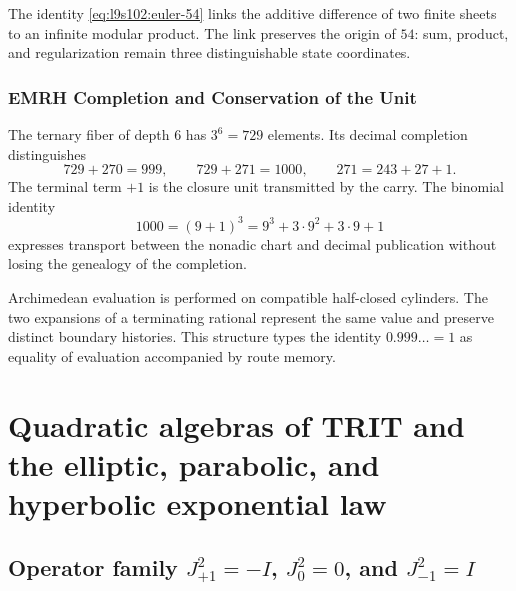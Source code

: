 The identity \cref{eq:l9s102:euler-54} links the additive difference of two finite sheets
to an infinite modular product. The link preserves the origin of
\(54\): sum, product, and regularization remain three distinguishable
state coordinates.

\subsubsection{EMRH Completion and Conservation of the Unit}
\label{sec:l9s102:euler-emrh}

The ternary fiber of depth \(6\) has \(3^6=729\) elements. Its
decimal completion distinguishes
\begin{equation}
 729+270=999,
 \qquad
 729+271=1000,
 \qquad
 271=243+27+1.
 \label{eq:l9s102:euler-729-1000}
\end{equation}
The terminal term \(+1\) is the closure unit transmitted by the
carry. The binomial identity
\begin{equation}
 1000=(9+1)^3=9^3+3\cdot9^2+3\cdot9+1
 \label{eq:l9s102:euler-binomial-1000}
\end{equation}
expresses transport between the nonadic chart and decimal publication
without losing the genealogy of the completion.

Archimedean evaluation is performed on compatible half-closed cylinders.
The two expansions of a terminating rational represent the
same value and preserve distinct boundary histories. This structure
types the identity \(0.999\ldots=1\) as equality of evaluation accompanied
by route memory.

\section{Quadratic algebras of TRIT and the elliptic, parabolic, and hyperbolic exponential law}
\label{sec:l9s102:euler-algebras-trit}

\subsection{Operator family \texorpdfstring{\(J_{+1}^2=-I\), \(J_0^2=0\), and \(J_{-1}^2=I\)}{J+1^2=-I, J0^2=0, and J-1^2=I}}

